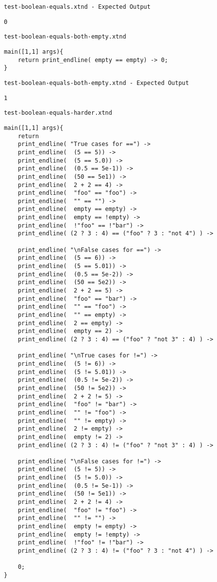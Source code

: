 \medskip \noindent \texttt{test-boolean-equals.xtnd - Expected Output}


\begin{lstlisting}
0
\end{lstlisting}


\medskip \noindent \texttt{test-boolean-equals-both-empty.xtnd}


\begin{lstlisting}
main([1,1] args){
	return print_endline( empty == empty) -> 0;
}
\end{lstlisting}


\medskip \noindent \texttt{test-boolean-equals-both-empty.xtnd - Expected Output}


\begin{lstlisting}
1
\end{lstlisting}


\medskip \noindent \texttt{test-boolean-equals-harder.xtnd}


\begin{lstlisting}
main([1,1] args){
	return
    print_endline( "True cases for ==") ->
    print_endline(  (5 == 5)) ->
    print_endline(  (5 == 5.0)) ->
    print_endline(  (0.5 == 5e-1)) ->
    print_endline(  (50 == 5e1)) ->
    print_endline(  2 + 2 == 4) ->
    print_endline(  "foo" == "foo") ->
    print_endline(  "" == "") ->
    print_endline(  empty == empty) ->
    print_endline(  empty == !empty) ->
    print_endline(  !"foo" == !"bar") ->
    print_endline( (2 ? 3 : 4) == ("foo" ? 3 : "not 4") ) ->

    print_endline( "\nFalse cases for ==") ->
    print_endline(  (5 == 6)) ->
    print_endline(  (5 == 5.01)) ->
    print_endline(  (0.5 == 5e-2)) ->
    print_endline(  (50 == 5e2)) ->
    print_endline(  2 + 2 == 5) ->
    print_endline(  "foo" == "bar") ->
    print_endline(  "" == "foo") ->
    print_endline(  "" == empty) ->
    print_endline(  2 == empty) ->
    print_endline(  empty == 2) ->
    print_endline( (2 ? 3 : 4) == ("foo" ? "not 3" : 4) ) ->

    print_endline( "\nTrue cases for !=") ->
    print_endline(  (5 != 6)) ->
    print_endline(  (5 != 5.01)) ->
    print_endline(  (0.5 != 5e-2)) ->
    print_endline(  (50 != 5e2)) ->
    print_endline(  2 + 2 != 5) ->
    print_endline(  "foo" != "bar") ->
    print_endline(  "" != "foo") ->
    print_endline(  "" != empty) ->
    print_endline(  2 != empty) ->
    print_endline(  empty != 2) ->
    print_endline( (2 ? 3 : 4) != ("foo" ? "not 3" : 4) ) ->

    print_endline( "\nFalse cases for !=") ->
    print_endline(  (5 != 5)) ->
    print_endline(  (5 != 5.0)) ->
    print_endline(  (0.5 != 5e-1)) ->
    print_endline(  (50 != 5e1)) ->
    print_endline(  2 + 2 != 4) ->
    print_endline(  "foo" != "foo") ->
    print_endline(  "" != "") ->
    print_endline(  empty != empty) ->
    print_endline(  empty != !empty) ->
    print_endline(  !"foo" != !"bar") ->
    print_endline( (2 ? 3 : 4) != ("foo" ? 3 : "not 4") ) ->

    0;
}
\end{lstlisting}


